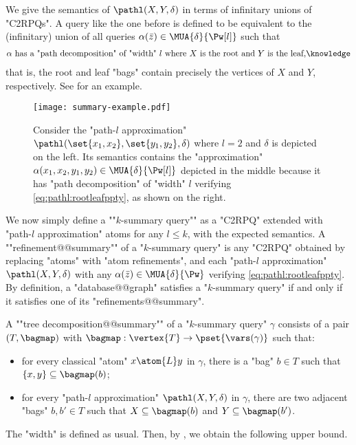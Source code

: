We give the semantics of $\pathl(X, Y, \delta)$ in terms of infinitary unions of "C2RPQs".
A query like the one before is defined to be equivalent to the (infinitary) union of all queries $\alpha(\bar z) \in \MUA{\delta}{\Pw[l]}$ such that
\begin{align}
	\text{$\alpha$ has a "path decomposition" of "width" $l$ where $X$ is the root and $Y$ is the leaf,}\AP\label{eq:pathl:rootleafppty}
\end{align}
that is, the root and leaf "bags" contain precisely the vertices of $X$ and $Y$, respectively.
 See  for an example.
\begin{figure}
  \centering
  \texttt{[image: summary-example.pdf]}
  \caption{
	\AP\label{fig:l-path-example}
	Consider the "path-$l$ approximation" $\pathl(\set{x_1,x_2}, \set{y_1,y_2},\delta)$ where $l=2$ and $\delta$ is depicted on the left. Its semantics contains the "approximation" $\alpha(x_1,x_2,y_1,y_2) \in \MUA{\delta}{\Pw[l]}$ depicted in the middle because it has "path decomposition" of "width" $l$ verifying \eqref{eq:pathl:rootleafppty}, as shown on the right.
	}
\end{figure}

\AP We now simply define a ""$k$-summary query"" as a "C2RPQ" extended with "path-$l$ approximation" atoms for any $l\leq k$, with the expected semantics.
A \AP""refinement@@summary"" of a "$k$-summary query" is any "C2RPQ" obtained by
replacing "atoms" with "atom refinements", and 
each "path-$l$ approximation" $\pathl(X, Y, \delta)$ with any
$\alpha(\bar z) \in \MUA{\delta}{\Pw}$ verifying \eqref{eq:pathl:rootleafppty}. By definition,
a "database@@graph" satisfies a "$k$-summary query" if and only if it
satisfies one of its "refinements@@summary".

A \AP ""tree decomposition@@summary"" of a "$k$-summary query" $\gamma$ consists of
a pair $(T, \bagmap)$ with $\bagmap: \vertex{T} \to \pset{\vars(\gamma)}$
such that:
\begin{itemize}
	\item for every classical "atom" $x \atom{L} y$ in $\gamma$,
		there is a "bag" $b \in T$ such that $\{x,y\} \subseteq \bagmap(b)$;
	\item for every "path-$l$ approximation" $\pathl(X, Y, \delta)$ in $\gamma$,
		there are two adjacent "bags" $b, b' \in T$ such that $X \subseteq \bagmap(b)$
		and $Y \subseteq \bagmap(b')$.
\end{itemize}
The "width" is defined as usual. Then, by
, we obtain the following upper bound.


